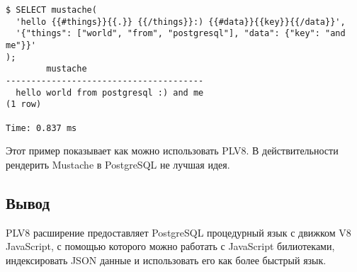 \begin{lstlisting}[label=lst:plv8js16,caption=Рендер темплейтов]
$ SELECT mustache(
  'hello {{#things}}{{.}} {{/things}}:) {{#data}}{{key}}{{/data}}',
  '{"things": ["world", "from", "postgresql"], "data": {"key": "and me"}}'
);
		mustache                
---------------------------------------
  hello world from postgresql :) and me
(1 row)

Time: 0.837 ms
\end{lstlisting}

Этот пример показывает как можно использовать PLV8. В действительности рендерить Mustache в PostgreSQL не лучшая идея.

\subsection{Вывод}

PLV8 расширение предоставляет PostgreSQL процедурный язык с движком V8 JavaScript, с помощью которого можно работать с JavaScript билиотеками, индексировать JSON данные и использовать его как более быстрый язык.